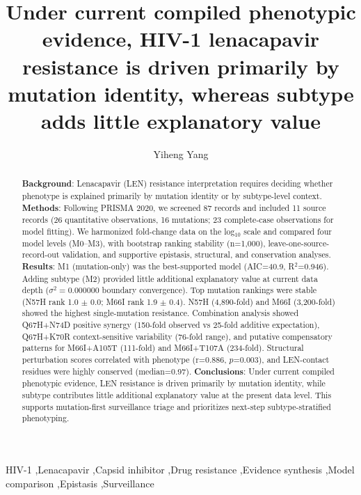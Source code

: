\documentclass[preprint,authoryear]{elsarticle}
\begin{document}
\begin{frontmatter}

\title{Under current compiled phenotypic evidence, HIV-1 lenacapavir resistance is driven primarily by mutation identity, whereas subtype adds little explanatory value}

\author[inst1,inst2]{Yiheng Yang}

\address[inst1]{School of Future Technology, Dalian University of Technology, Dalian, China}
\address[inst2]{School of Bioengineering, Dalian University of Technology, Dalian, China}

\begin{abstract}
\textbf{Background}: Lenacapavir (LEN) resistance interpretation requires deciding whether phenotype is explained primarily by mutation identity or by subtype-level context. 
\textbf{Methods}: Following PRISMA 2020, we screened 87 records and included 11 source records (26 quantitative observations, 16 mutations; 23 complete-case observations for model fitting). We harmonized fold-change data on the log$_{10}$ scale and compared four model levels (M0--M3), with bootstrap ranking stability (n=1,000), leave-one-source-record-out validation, and supportive epistasis, structural, and conservation analyses.
\textbf{Results}: M1 (mutation-only) was the best-supported model (AIC=40.9, R$^{2}$=0.946). Adding subtype (M2) provided little additional explanatory value at current data depth ($\sigma^2=0.000000$ boundary convergence). Top mutation rankings were stable (N57H rank 1.0 $\pm$ 0.0; M66I rank 1.9 $\pm$ 0.4). N57H (4,890-fold) and M66I (3,200-fold) showed the highest single-mutation resistance. Combination analysis showed Q67H+N74D positive synergy (150-fold observed vs 25-fold additive expectation), Q67H+K70R context-sensitive variability (76-fold range), and putative compensatory patterns for M66I+A105T (111-fold) and M66I+T107A (234-fold). Structural perturbation scores correlated with phenotype (r=0.886, $p$=0.003), and LEN-contact residues were highly conserved (median=0.97).
\textbf{Conclusions}: Under current compiled phenotypic evidence, LEN resistance is driven primarily by mutation identity, while subtype contributes little additional explanatory value at the present data level. This supports mutation-first surveillance triage and prioritizes next-step subtype-stratified phenotyping.
\end{abstract}

\begin{keyword}
HIV-1 \sep Lenacapavir \sep Capsid inhibitor \sep Drug resistance \sep Evidence synthesis \sep Model comparison \sep Epistasis \sep Surveillance
\end{keyword}

\end{frontmatter}
\end{document}
